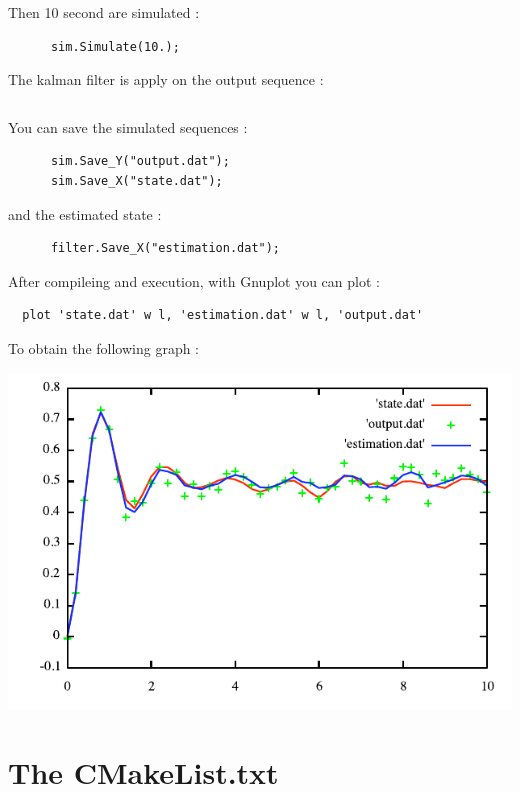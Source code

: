 Then 10 second are simulated : 

\begin{DocInclude}\begin{verbatim}      sim.Simulate(10.);
\end{verbatim}
\end{DocInclude}
 The kalman filter is apply on the output sequence : 

\begin{DocInclude}\begin{verbatim}\end{verbatim}
\end{DocInclude}
 You can save the simulated sequences : 

\begin{DocInclude}\begin{verbatim}      sim.Save_Y("output.dat");
      sim.Save_X("state.dat");
\end{verbatim}
\end{DocInclude}


and the estimated state : 

\begin{DocInclude}\begin{verbatim}      filter.Save_X("estimation.dat");
\end{verbatim}
\end{DocInclude}


After compileing and execution, with Gnuplot you can plot : 

\begin{Code}\begin{verbatim}  plot 'state.dat' w l, 'estimation.dat' w l, 'output.dat'
\end{verbatim}
\end{Code}

 To obtain the following graph :  \begin{ImageNoCaption}\mbox{\includegraphics{ornstein}}
\end{ImageNoCaption}
\hypertarget{page2_sec3}{}\section{The CMakeList.txt}\label{page2_sec3}



